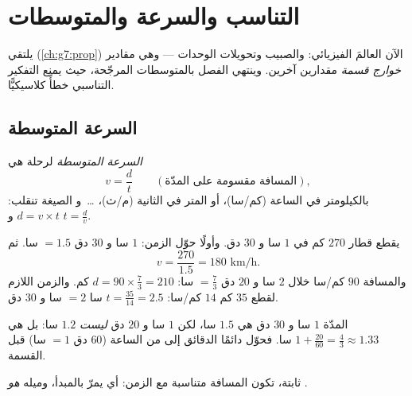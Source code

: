 \chapter{التناسب والسرعة والمتوسطات}\label{ch:g8:speed}

يلتقي  (\cref{ch:g7:prop}) الآن العالمَ الفيزيائي:
 والصبيب وتحويلات الوحدات --- وهي مقادير
\emph{خوارج قسمة} مقدارين آخرين. وينتهي الفصل بالمتوسطات
المرجّحة، حيث يمنع التفكير التناسبي خطأً كلاسيكيًّا.

\section{السرعة المتوسطة}

\begin{definition}\label{def:g8:speed:def}
\emph{السرعة المتوسطة} لرحلة هي 
\[
v = \frac{d}{t}
\qquad
\left(\text{المسافة مقسومة على المدّة}\right),
\]
بالكيلومتر في الساعة (كم/سا)، أو المتر في الثانية (م/ث)، \dots\ و
الصيغة تنقلب: $d = v \times t$ و $t = \frac{d}{v}$.
\end{definition}

\begin{example}\label{ex:g8:speed:basic}
يقطع قطار $270$ كم في $1$ سا و $30$ دق. وأولًا حوّل الزمن:
$1$ سا و $30$ دق $= 1.5$ سا. ثم
\[
v = \frac{270}{1.5} = 180 \text{ km/h}.
\]
والمسافة  $90$ كم/سا خلال $2$ سا و $20$ دق $= \frac73$ سا:
$d = 90 \times \frac73 = 210$ كم. والزمن اللازم لقطع $35$ كم  $14$ كم/سا:
$t = \frac{35}{14} = 2.5$ سا $= 2$ سا و $30$ دق.
\end{example}

\begin{remark}
المدّة $1$ سا و $30$ دق هي $1.5$ سا، لكن $1$ سا و $20$ دق \emph{ليست} $1.2$ سا:
بل هي $1 + \frac{20}{60} = \frac43 \approx 1.33$ سا. فحوّل دائمًا
الدقائق إلى  من الساعة ($60$ دق $= 1$ سا) قبل القسمة.
\end{remark}

\begin{omfigure}

{\small {} ثابتة، تكون المسافة متناسبة مع الزمن: أي
 يمرّ بالمبدأ، وميله \emph{هو}
.}
\end{omfigure}

